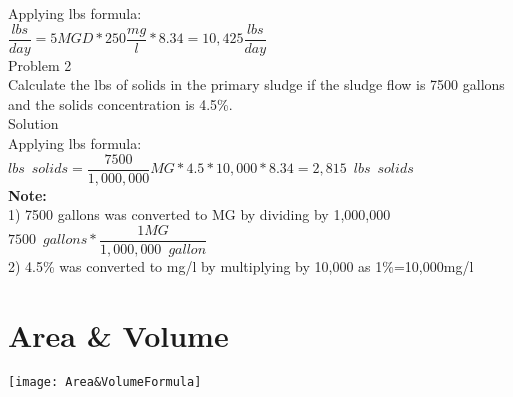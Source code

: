 Applying lbs formula:\\
$\dfrac{lbs}{day}=5 MGD *250\dfrac{mg}{l}*8.34 = \boxed{10,425\dfrac{lbs}{day}}$
\\
Problem 2\\Calculate the lbs of solids in the primary sludge if the sludge flow is 7500 gallons and the solids concentration is 4.5\%.\\
Solution\\
Applying lbs formula:\\
$lbs \enspace solids = \dfrac{7500}{1,000,000}MG * 4.5*10,000 *8.34 = \boxed{2,815 \enspace lbs \enspace solids}$\\
\textbf{Note:}\\  
1) 7500 gallons was converted to MG by dividing by 1,000,000\\
$7500 \enspace gallons * \dfrac{1 MG}{1,000,000 \enspace gallon}$\\
2) 4.5\% was converted to mg/l by multiplying by 10,000 as 1\%=10,000mg/l

\newpage
\section{Area \& Volume}


\begin{center}
\texttt{[image: Area\&VolumeFormula]}
\end{center}
